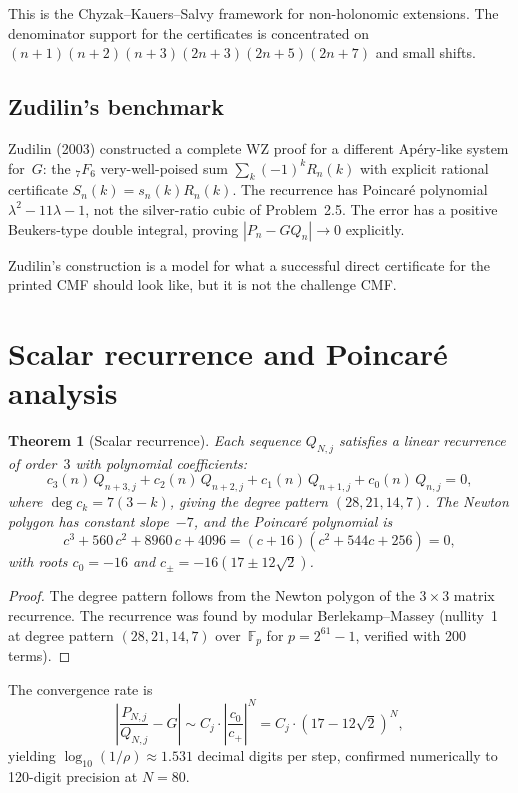 \documentclass[11pt]{article}
\newtheorem{theorem}{Theorem}
\begin{document}
This is the Chyzak--Kauers--Salvy framework for non-holonomic
extensions. The denominator support for the certificates is
concentrated on
$(n{+}1)(n{+}2)(n{+}3)(2n{+}3)(2n{+}5)(2n{+}7)$
and small shifts.

\subsection{Zudilin's benchmark}

Zudilin (2003) constructed a complete WZ proof for a different
Ap\'ery-like system for~$G$: the ${}_7F_6$ very-well-poised sum
$\sum_k (-1)^k R_n(k)$ with explicit rational certificate
$S_n(k) = s_n(k)R_n(k)$. The recurrence has Poincar\'e
polynomial $\lambda^2 - 11\lambda - 1$, not the silver-ratio
cubic of Problem~2.5. The error has a positive Beukers-type
double integral, proving $|P_n - GQ_n| \to 0$ explicitly.

Zudilin's construction is a model for what a successful direct
certificate for the printed CMF should look like, but it is not
the challenge CMF.

\section{Scalar recurrence and Poincar\'e analysis}

\begin{theorem}[Scalar recurrence]\label{thm:scalar}
Each sequence $Q_{N,j}$ satisfies a linear recurrence of order~$3$
with polynomial coefficients:
\[
c_3(n)\,Q_{n+3,j} + c_2(n)\,Q_{n+2,j}
+ c_1(n)\,Q_{n+1,j} + c_0(n)\,Q_{n,j} = 0,
\]
where $\deg c_k = 7(3-k)$, giving the degree pattern
$(28,21,14,7)$.  The Newton polygon has constant slope~$-7$,
and the Poincar\'e polynomial is
\begin{equation}\label{eq:poincare2}
c^3 + 560\,c^2 + 8960\,c + 4096 = (c+16)(c^2+544c+256) = 0,
\end{equation}
with roots $c_0 = -16$ and
$c_\pm = -16(17 \pm 12\sqrt{2})$.
\end{theorem}

\begin{proof}
The degree pattern follows from the Newton polygon of the
$3\times 3$ matrix recurrence.  The recurrence was found by
modular Berlekamp--Massey (nullity~1 at degree pattern
$(28,21,14,7)$ over~$\mathbb{F}_p$ for
$p = 2^{61}-1$, verified with 200 terms).
\end{proof}

The convergence rate is
\[
\left|\frac{P_{N,j}}{Q_{N,j}} - G\right|
\sim C_j \cdot \left|\frac{c_0}{c_+}\right|^N
= C_j \cdot (17-12\sqrt{2})^N,
\]
yielding $\log_{10}(1/\rho) \approx 1.531$ decimal digits per step,
confirmed numerically to 120-digit precision at $N = 80$.
\end{document}
